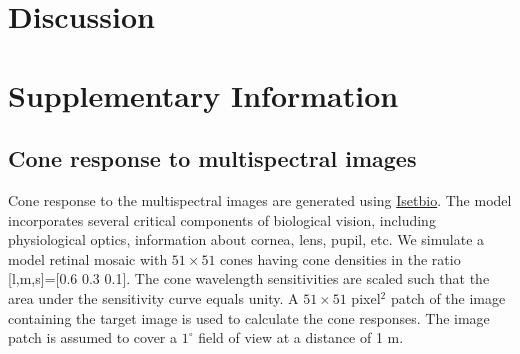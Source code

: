 \documentclass{jov}
\begin{document}
\section{Discussion} \label{Discussion}
\section{Supplementary Information}


\subsection{Cone response to multispectral images}
Cone response to the multispectral images are generated
using \href{https://github.com/isetbio}{Isetbio}. The model incorporates several critical components of biological vision, including physiological optics, information about cornea, lens, pupil, etc. We simulate a model retinal mosaic with $51\times51$ cones having cone densities in the ratio [l,m,s]=[0.6 0.3 0.1]. The cone wavelength sensitivities are scaled such that the area under the sensitivity curve equals unity. A $51\times51$ pixel$^2$ patch of the image containing the target image is used to calculate the cone responses. The image patch is assumed to cover a $1^{\circ}$ field of view at a distance of 1 m.



\end{document}
